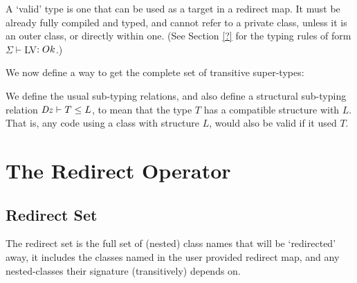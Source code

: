 A `valid' type is one that can be used as a target in a redirect map. It must be already fully compiled and typed, and cannot refer to a private class, unless it is an outer class, or directly within one. (See Section \ref{?} for the typing rules of form $\Sigma \vdash $LV$ : {Ok}$.)


We now define a way to get the complete set of transitive super-types:

\begin{defs}
\end{defs}

We define the usual sub-typing relations, and also define a structural sub-typing relation $\mathit{Dz} \vdash T \leq L$, to mean that the type $T$ has a compatible structure with $L$. That is, any code using a class with structure $L$, would also be valid if it used $T$.

\begin{defs}
{}
\end{defs}

\section{The Redirect Operator}

\subsection{Redirect Set}
The redirect set is the full set of (nested) class names that will be `redirected' away, it includes the classes named in the user provided redirect map, and any nested-classes their signature (transitively) depends on.


